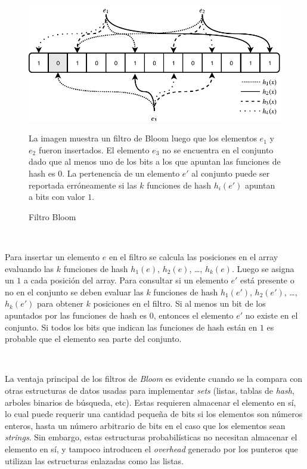 \documentclass[a4paper,12pt, oneside]{article}
\begin{document}
\begin{figure}[ht]
	\centering
	\includegraphics[width=1\textwidth]{./graph/bloom.pdf}
	\caption{Filtro Bloom}
	\label{fig:bloom}
	\medskip
	\small
	
	\parbox{13.1cm}{La imagen muestra un filtro de Bloom luego que los elementos $e_1$ y $e_2$ fueron insertados. El elemento $e_3$ no se encuentra en el conjunto dado que al menos uno de los bits a los que apuntan las funciones de hash es $0$. La pertenencia de un elemento $e'$ al conjunto puede ser reportada erróneamente si las $k$ funciones de hash $h_i(e')$ apuntan a bits con valor $1$.}
	
\end{figure}

\

Para insertar un elemento $e$ en el filtro se calcula las posiciones en el array evaluando las $k$ funciones de hash $h_1(e)$, $h_2(e)$, \dots, $h_k(e)$. Luego se asigna un $1$ a cada posición del array. Para consultar si un elemento $e'$ está presente o no en el conjunto se deben evaluar las $k$ funciones de hash $h_1(e')$, $h_2(e')$, \dots, $h_k(e')$ para obtener $k$ posiciones en el filtro. Si al menos un bit de los apuntados por las funciones de hash es $0$, entonces el elemento $e'$ no existe en el conjunto. Si todos los bits que indican las funciones de hash están en $1$ es probable que el elemento sea parte del conjunto.

\

La ventaja principal de los filtros de \textit{Bloom} es evidente cuando se la compara con otras estructuras de datos usadas para implementar \textit{sets} (listas, tablas de \textit{hash}, arboles binarios de búsqueda, etc). Estas requieren almacenar el elemento en sí, lo cual puede requerir una cantidad pequeña de bits si los elementos son números enteros, hasta un número arbitrario de bits en el caso que los elementos sean \textit{strings}. Sin embargo, estas estructuras probabilísticas no necesitan almacenar el elemento en sí, y tampoco introducen el \textit{overhead} generado por los punteros que utilizan las estructuras enlazadas como las listas.
\end{document}
